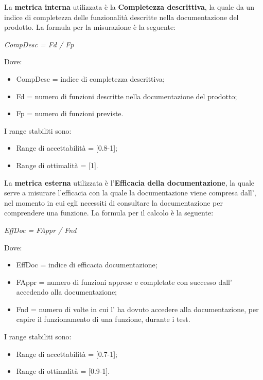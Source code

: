 \begin{itemize}
      La \textbf{metrica interna} utilizzata è la \textbf{Completezza descrittiva},
      la quale da un indice di completezza delle funzionalità descritte nella documentazione del prodotto.
      La formula per la misurazione è la seguente:
      \begin{center}
        \emph{CompDesc = Fd / Fp}
      \end{center}
      Dove:
      \begin{itemize}
        \item CompDesc = indice di completezza descrittiva;
        \item Fd = numero di funzioni descritte nella documentazione del prodotto;
        \item Fp = numero di funzioni previste.
      \end{itemize}
      I range stabiliti sono:
      \begin{itemize}
        \item Range di accettabilità = [0.8-1];
        \item Range di ottimalità = [1].
      \end{itemize}
      La \textbf{metrica esterna} utilizzata è l'\textbf{Efficacia della documentazione}, la quale serve a misurare l'efficacia con la quale la documentazione viene compresa dall',
      nel momento in cui egli necessiti di consultare la documentazione per comprendere una funzione.
      La formula per il calcolo è la seguente:
      \begin{center}
        \emph{EffDoc = FAppr / Fnd}
      \end{center}
      Dove:
      \begin{itemize}
        \item EffDoc = indice di efficacia documentazione;
        \item FAppr = numero di funzioni apprese e completate con successo dall' accedendo alla documentazione;
        \item Fnd = numero di volte in cui l' ha dovuto accedere alla documentazione, per capire il funzionamento di una funzione, durante i test.
      \end{itemize}
      I range stabiliti sono:
      \begin{itemize}
        \item Range di accettabilità = [0.7-1];
        \item Range di ottimalità = [0.9-1].
      \end{itemize}

\end{itemize}
